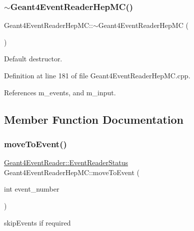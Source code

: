 \subsubsection{\texorpdfstring{$\sim$\+Geant4\+Event\+Reader\+Hep\+M\+C()}{~Geant4EventReaderHepMC()}}
{\footnotesize\ttfamily Geant4\+Event\+Reader\+Hep\+M\+C\+::$\sim$\+Geant4\+Event\+Reader\+Hep\+MC (\begin{DoxyParamCaption}{ }\end{DoxyParamCaption})\hspace{0.3cm}{\ttfamily [virtual]}}



Default destructor. 



Definition at line 181 of file Geant4\+Event\+Reader\+Hep\+M\+C.\+cpp.



References m\+\_\+events, and m\+\_\+input.



\subsection{Member Function Documentation}
\hypertarget{class_d_d4hep_1_1_simulation_1_1_geant4_event_reader_hep_m_c_a95ba8736c8274f5b24b6cd0e0b424c33}{}\label{class_d_d4hep_1_1_simulation_1_1_geant4_event_reader_hep_m_c_a95ba8736c8274f5b24b6cd0e0b424c33} 
\subsubsection{\texorpdfstring{move\+To\+Event()}{moveToEvent()}}
{\footnotesize\ttfamily \hyperlink{class_d_d4hep_1_1_simulation_1_1_geant4_event_reader_ae4f4bc83ffcf5b0c1868ad78859851e7}{Geant4\+Event\+Reader\+::\+Event\+Reader\+Status} Geant4\+Event\+Reader\+Hep\+M\+C\+::move\+To\+Event (\begin{DoxyParamCaption}\item[{int}]{event\+\_\+number }\end{DoxyParamCaption})\hspace{0.3cm}{\ttfamily [virtual]}}



skip\+Events if required 



